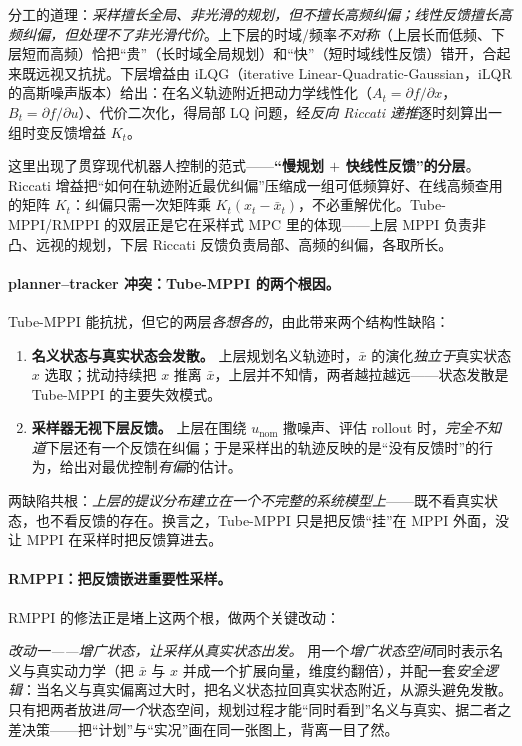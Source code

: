 \noindent 分工的道理：\emph{采样擅长全局、非光滑的规划，但不擅长高频纠偏；线性反馈擅长高频纠偏，但处理不了非光滑代价}。上下层的时域/频率\emph{不对称}（上层长而低频、下层短而高频）恰把“贵”（长时域全局规划）和“快”（短时域线性反馈）错开，合起来既远视又抗扰。下层增益由 iLQG（iterative Linear-Quadratic-Gaussian，iLQR 的高斯噪声版本）给出：在名义轨迹附近把动力学线性化（$A_t=\partial f/\partial x$，$B_t=\partial f/\partial u$）、代价二次化，得局部 LQ 问题，经\emph{反向 Riccati 递推}逐时刻算出一组时变反馈增益 $K_t$\cite{tassa2012ilqg}。

\begin{insight}
这里出现了贯穿现代机器人控制的范式——\textbf{“慢规划 $+$ 快线性反馈”的分层}。Riccati 增益把“如何在轨迹附近最优纠偏”压缩成一组可低频算好、在线高频查用的矩阵 $K_t$：纠偏只需一次矩阵乘 $K_t(x_t-\bar x_t)$，不必重解优化。Tube-MPPI/RMPPI 的双层正是它在采样式 MPC 里的体现——上层 MPPI 负责非凸、远视的规划，下层 Riccati 反馈负责局部、高频的纠偏，各取所长。
\end{insight}

\paragraph{planner--tracker 冲突：Tube-MPPI 的两个根因。}
Tube-MPPI 能抗扰，但它的两层\emph{各想各的}，由此带来两个结构性缺陷\cite{gandhi2021robust}：
\begin{enumerate}
  \item \textbf{名义状态与真实状态会发散。} 上层规划名义轨迹时，$\bar{x}$ 的演化\emph{独立于}真实状态 $x$ 选取；扰动持续把 $x$ 推离 $\bar{x}$，上层并不知情，两者越拉越远——状态发散是 Tube-MPPI 的主要失效模式。
  \item \textbf{采样器无视下层反馈。} 上层在围绕 $u_{\text{nom}}$ 撒噪声、评估 rollout 时，\emph{完全不知道}下层还有一个反馈在纠偏；于是采样出的轨迹反映的是“没有反馈时”的行为，给出对最优控制\emph{有偏}的估计。
\end{enumerate}
两缺陷共根：\emph{上层的提议分布建立在一个不完整的系统模型上}——既不看真实状态，也不看反馈的存在。换言之，Tube-MPPI 只是把反馈“挂”在 MPPI 外面，没让 MPPI 在采样时把反馈算进去。

\paragraph{RMPPI：把反馈嵌进重要性采样。}
RMPPI 的修法正是堵上这两个根，做两个关键改动\cite{gandhi2021robust}：

\emph{改动一——增广状态，让采样从真实状态出发。} 用一个\emph{增广状态空间}同时表示名义与真实动力学（把 $\bar x$ 与 $x$ 并成一个扩展向量，维度约翻倍），并配一套\emph{安全逻辑}：当名义与真实偏离过大时，把名义状态拉回真实状态附近，从源头避免发散。只有把两者放进\emph{同一个}状态空间，规划过程才能“同时看到”名义与真实、据二者之差决策——把“计划”与“实况”画在同一张图上，背离一目了然。

